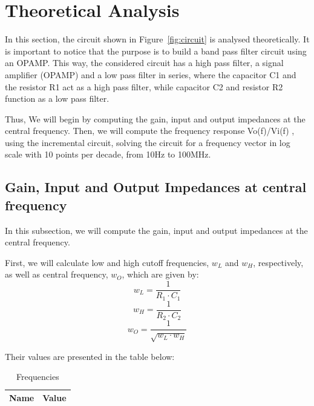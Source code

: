 \section{Theoretical Analysis}
\label{sec:analysis}
In this section, the circuit shown in Figure~\ref{fig:circuit} is analysed theoretically.
It is important to notice that the purpose is to build a band pass filter circuit using an OPAMP.
This way, the considered circuit has a high pass filter, a signal amplifier (OPAMP) and a low pass filter in series,
where the capacitor C1 and the resistor R1 act as a high pass filter, while capacitor C2 and resistor R2 function as a low pass filter.

Thus, We will begin by computing the gain, input and output impedances at the central frequency.
Then, we will compute the frequency response Vo(f)/Vi(f) , using the incremental circuit, 
solving the circuit for a frequency vector in log scale with 10 points per decade, from 10Hz to 100MHz.

\subsection{Gain, Input and Output Impedances at central frequency}
In this subsection, we will compute the gain, input and output impedances at the central frequency.

First, we will calculate low and high cutoff frequencies, $w_L$ and $ w_H$, respectively, as well as central frequency, $w_O$, which are given by:
\begin{equation}
	w_L=\frac{1}{R_{1} \cdot C_{1}}
\end{equation}
\begin{equation}
	w_H=\frac{1}{R_{2} \cdot C_{2}}
\end{equation}
\begin{equation}
	w_O=\frac{1}{ \sqrt{w_{L} \cdot w_{H}}}
\end{equation}

Their values are presented in the table below:
\begin{table}[H]
  \centering
  \begin{tabular}{|l|r|}
     \hline    
    {\bf Name} & {\bf Value} \\ \hline   
    
  \end{tabular}
  \caption{Frequencies}
  \label{tab:freq}
\end{table}

